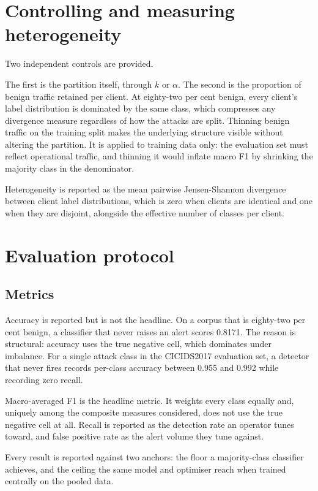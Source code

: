 \section{Controlling and measuring heterogeneity}
\label{sec:hetero-control}

Two independent controls are provided.

The first is the partition itself, through $k$ or $\alpha$. The second is the
proportion of benign traffic retained per client. At eighty-two per cent benign,
every client's label distribution is dominated by the same class, which
compresses any divergence measure regardless of how the attacks are split.
Thinning benign traffic on the training split makes the underlying structure
visible without altering the partition. It is applied to training data only:
the evaluation set must reflect operational traffic, and thinning it would
inflate macro F1 by shrinking the majority class in the denominator.

Heterogeneity is reported as the mean pairwise Jensen-Shannon divergence
between client label distributions, which is zero when clients are identical
and one when they are disjoint, alongside the effective number of classes per
client.

\section{Evaluation protocol}
\label{sec:eval-protocol}

\subsection{Metrics}

Accuracy is reported but is not the headline. On a corpus that is eighty-two
per cent benign, a classifier that never raises an alert scores 0.8171. The
reason is structural: accuracy uses the true negative cell, which dominates
under imbalance. For a single attack class in the CICIDS2017 evaluation set, a
detector that never fires records per-class accuracy between 0.955 and 0.992
while recording zero recall.

Macro-averaged F1 is the headline metric. It weights every class equally and,
uniquely among the composite measures considered, does not use the true
negative cell at all. Recall is reported as the detection rate an operator
tunes toward, and false positive rate as the alert volume they tune against.

Every result is reported against two anchors: the floor a majority-class
classifier achieves, and the ceiling the same model and optimiser reach when
trained centrally on the pooled data.

